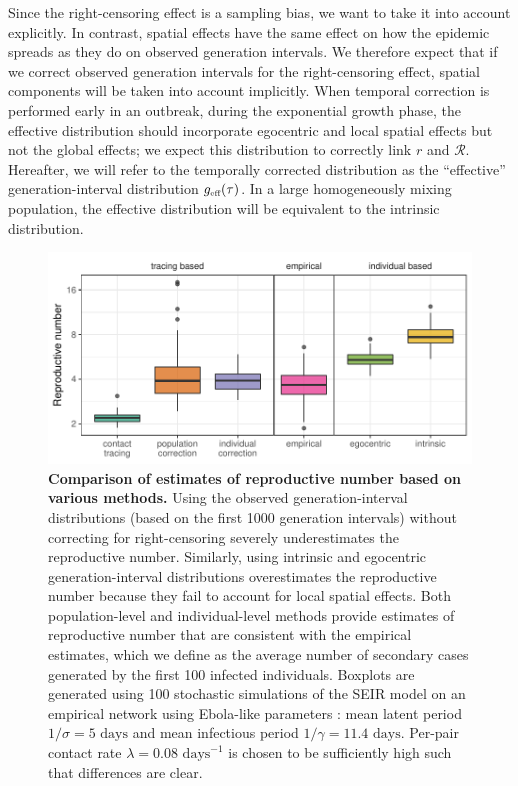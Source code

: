 \documentclass[12pt]{article}
\newcommand{\RR}{\ensuremath{{\mathcal R}}}
\newcommand{\tsub}[2]{#1_{{\textrm{\tiny #2}}}}
\begin{document}
Since the right-censoring effect is a sampling bias, we want to take it into account explicitly.
In contrast, spatial effects have the same effect on how the epidemic spreads as they do on observed generation intervals. 
We therefore expect that if we correct observed generation intervals for the right-censoring effect, spatial components will be taken into account implicitly. 
When temporal correction is performed early in an outbreak, during the exponential growth phase, the effective distribution should incorporate egocentric and local spatial effects but not the global effects; we expect this distribution to correctly link $r$ and $\RR$.
Hereafter, we will refer to the temporally corrected distribution as the ``effective'' generation-interval distribution $\tsub{g}{eff}(\tau)$.
In a large homogeneously mixing population, the effective distribution will be equivalent to the intrinsic distribution.

\begin{figure}[!pbth]
\includegraphics[width=\textwidth]{../fig/cmp_reproductive.pdf}
\caption{\textbf{Comparison of estimates of reproductive number based on various methods.}
Using the observed generation-interval distributions (based on the first 1000 generation intervals) without correcting for right-censoring severely underestimates the reproductive number.
Similarly, using intrinsic and egocentric generation-interval distributions overestimates the reproductive number because they fail to account for local spatial effects.
Both population-level and individual-level methods provide estimates of reproductive number that are consistent with the empirical estimates, which we define as the average number of secondary cases generated by the first 100 infected individuals.
Boxplots are generated using 100 stochastic simulations of the SEIR model on an empirical network using Ebola-like parameters \citep{who2014ebola}: mean latent period $1/\sigma = 5 \textrm{ days}$ and mean infectious period $1/\gamma = 11.4 \textrm{ days}$. 
Per-pair contact rate $\lambda = 0.08 \textrm{ days}^{-1}$ is chosen to be sufficiently high such that differences are clear.
}
\label{fig:cmp}
\end{figure}
\end{document}

